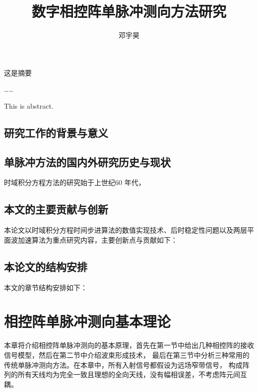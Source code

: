 \documentclass[master]{thesis-uestc}
\title{数字相控阵单脉冲测向方法研究}{The Research on Monopulse estimation with 
Digital Phased Array}
\author{邓宇昊}{Yuhao Deng}
\begin{document}
\makecover

\begin{chineseabstract}
这是摘要

……

\end{chineseabstract}

\begin{englishabstract}
This is abstract.

\end{englishabstract}

\thesistableofcontents

\thesischapterexordium

\section{研究工作的背景与意义}

\section{单脉冲方法的国内外研究历史与现状}
时域积分方程方法的研究始于上世纪60 年代，

\section{本文的主要贡献与创新}
本论文以时域积分方程时间步进算法的数值实现技术、后时稳定性问题以及两层平面波加速算法为重点研究内容，主要创新点与贡献如下：

\section{本论文的结构安排}
本文的章节结构安排如下：

\chapter{相控阵单脉冲测向基本理论}
本章将介绍相控阵单脉冲测向的基本原理，首先在第一节中给出几种相控阵的接收信号模型，然后在第二节中介绍波束形成技术，
最后在第三节中分析三种常用的传统单脉冲测向方法。在本章中，所有入射信号都假设为远场窄带信号，
构成阵列的所有天线均为完全一致且理想的全向天线，没有幅相误差，不考虑阵元间互耦。
\end{document}
